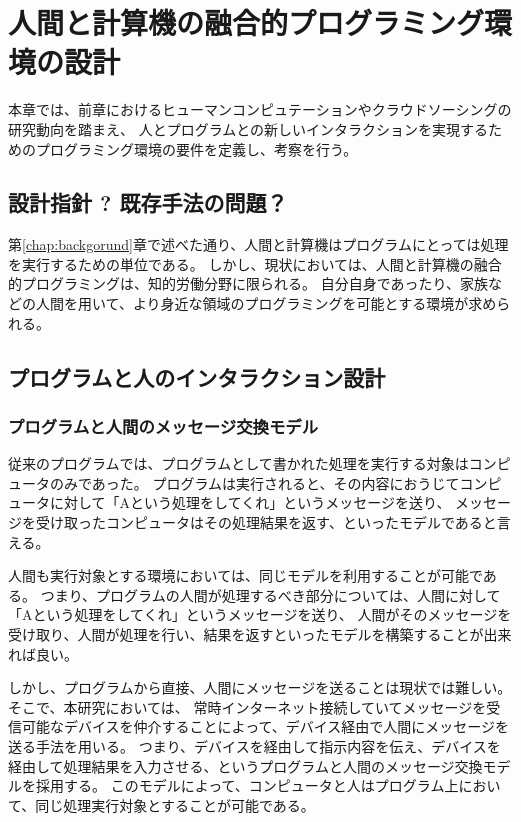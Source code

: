 \chapter{人間と計算機の融合的プログラミング環境の設計}\label{chap:design}

本章では、前章におけるヒューマンコンピュテーションやクラウドソーシングの研究動向を踏まえ、
人とプログラムとの新しいインタラクションを実現するためのプログラミング環境の要件を定義し、考察を行う。

\section{設計指針 ?
既存手法の問題？}\label{ux8a2dux8a08ux6307ux91dd-ux65e2ux5b58ux624bux6cd5ux306eux554fux984c}

第\ref{chap:backgorund}章で述べた通り、人間と計算機はプログラムにとっては処理を実行するための単位である。
しかし、現状においては、人間と計算機の融合的プログラミングは、知的労働分野に限られる。
自分自身であったり、家族などの人間を用いて、より身近な領域のプログラミングを可能とする環境が求められる。

\section{プログラムと人のインタラクション設計}\label{ux30d7ux30edux30b0ux30e9ux30e0ux3068ux4ebaux306eux30a4ux30f3ux30bfux30e9ux30afux30b7ux30e7ux30f3ux8a2dux8a08}

\subsection{プログラムと人間のメッセージ交換モデル}\label{ux30d7ux30edux30b0ux30e9ux30e0ux3068ux4ebaux9593ux306eux30e1ux30c3ux30bbux30fcux30b8ux4ea4ux63dbux30e2ux30c7ux30eb}

従来のプログラムでは、プログラムとして書かれた処理を実行する対象はコンピュータのみであった。
プログラムは実行されると、その内容におうじてコンピュータに対して「Aという処理をしてくれ」というメッセージを送り、
メッセージを受け取ったコンピュータはその処理結果を返す、といったモデルであると言える。

人間も実行対象とする環境においては、同じモデルを利用することが可能である。
つまり、プログラムの人間が処理するべき部分については、人間に対して「Aという処理をしてくれ」というメッセージを送り、
人間がそのメッセージを受け取り、人間が処理を行い、結果を返すといったモデルを構築することが出来れば良い。

しかし、プログラムから直接、人間にメッセージを送ることは現状では難しい。
そこで、本研究においては、
常時インターネット接続していてメッセージを受信可能なデバイスを仲介することによって、デバイス経由で人間にメッセージを送る手法を用いる。
つまり、デバイスを経由して指示内容を伝え、デバイスを経由して処理結果を入力させる、というプログラムと人間のメッセージ交換モデルを採用する。
このモデルによって、コンピュータと人はプログラム上において、同じ処理実行対象とすることが可能である。

